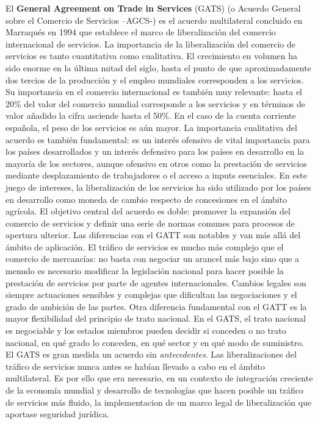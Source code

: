 \documentclass{nuevotema}
\begin{document}
El \textbf{General Agreement on Trade in Services} (GATS) (o Acuerdo General sobre el Comercio de Servicios --AGCS-) es el acuerdo multilateral concluido en Marraqués en 1994 que establece el marco de liberalización del comercio internacional de servicios. La importancia de la liberalización del comercio de servicios es tanto cuantitativa como cualitativa. El crecimiento en volumen ha sido enorme en la última mitad del siglo, hasta el punto de que aproximadamente dos tercios de la producción y el empleo mundiales corresponden a los servicios. Su importancia en el comercio internacional es también muy relevante: hasta el 20\% del valor del comercio mundial corresponde a los servicios y en términos de valor añadido la cifra asciende hasta el 50\%. En el caso de la cuenta corriente española, el peso de los servicios es aún mayor. La importancia cualitativa del acuerdo es también fundamental: es un interés ofensivo de vital importancia para los países desarrollados y un interés defensivo para los países en desarrollo en la mayoría de los sectores, aunque ofensivo en otros como la prestación de servicios mediante desplazamiento de trabajadores o el acceso a inputs esenciales. En este juego de intereses, la liberalización de los servicios ha sido utilizado por los países en desarrollo como moneda de cambio respecto de concesiones en el ámbito agrícola. El objetivo central del acuerdo es doble: promover la expansión del comercio de servicios y definir una serie de normas comunes para procesos de apertura ulterior. Las diferencias con el GATT son notables y van más allá del ámbito de aplicación. El tráfico de servicios es mucho más complejo que el comercio de mercancías: no basta con negociar un arancel más bajo sino que a menudo es necesario modificar la legislación nacional para hacer posible la prestación de servicios por parte de agentes internacionales. Cambios legales son siempre actuaciones sensibles y complejas que dificultan las negociaciones y el grado de ambición de las partes. Otra diferencia fundamental con el GATT es la mayor flexibilidad del principio de trato nacional. En el GATS, el trato nacional es negociable y los estados miembros pueden decidir si conceden o no trato nacional, en qué grado lo conceden, en qué sector y en qué modo de suministro. El GATS es gran medida un acuerdo sin \textit{antecedentes}. Las liberalizaciones del tráfico de servicios nunca antes se habían llevado a cabo en el ámbito multilateral. Es por ello que era necesario, en un contexto de integración creciente de la economía mundial y desarrollo de tecnologías que hacen posible un tráfico de servicios más fluido, la implementacion de un marco legal de liberalización que aportase seguridad jurídica.
\end{document}
